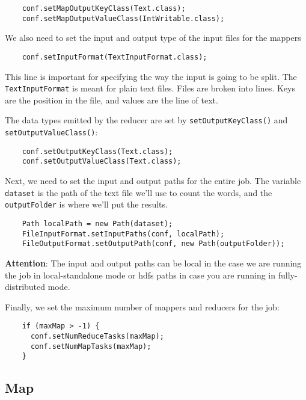 \documentclass[a4paper,10pt]{article}
\begin{document}
  \lstset{language=Java}      
  \begin{lstlisting}
    conf.setMapOutputKeyClass(Text.class);
    conf.setMapOutputValueClass(IntWritable.class);
  \end{lstlisting}
  
  We also need to set the input and output type of the input files for the mappers 
  \begin{lstlisting}
    conf.setInputFormat(TextInputFormat.class);
  \end{lstlisting}
  This line is important for specifying the way the input is going to be split. The \texttt{TextInputFormat} is meant for plain text files. Files are broken into lines. Keys are the position in the file, and values are the line of text.
  
  
  The data types emitted by the reducer are set by \texttt{setOutputKeyClass()} and \texttt{setOutputValueClass()}:
  
  \begin{lstlisting}
    conf.setOutputKeyClass(Text.class);
    conf.setOutputValueClass(Text.class);
  \end{lstlisting}       
  
  
  Next, we need to set the input and output paths for the entire job. The variable \texttt{dataset} is the path of the text file we'll use to count the words, and the \texttt{outputFolder} is where we'll put the results. 
  
  \begin{lstlisting}
    Path localPath = new Path(dataset);
    FileInputFormat.setInputPaths(conf, localPath);
    FileOutputFormat.setOutputPath(conf, new Path(outputFolder));
  \end{lstlisting}       
  
  \textbf{Attention}: The input and output paths can be local in the case we are running the job in local-standalone mode or hdfs paths in case you are running in fully-distributed mode. 
  
  Finally, we set the maximum number of mappers and reducers for the job:
  \begin{lstlisting}
    if (maxMap > -1) {
      conf.setNumReduceTasks(maxMap);
      conf.setNumMapTasks(maxMap);
    }
  \end{lstlisting}
  
  
  \subsection{Map}
  
\end{document}
